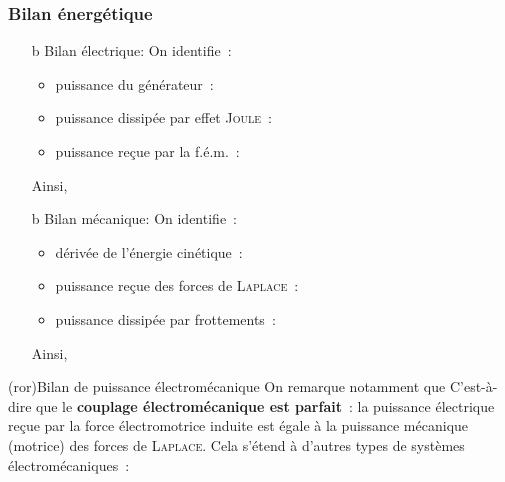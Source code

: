 \documentclass[../../main/main.tex]{subfiles}
\begin{document}
\subsubsection{Bilan énergétique}
\label{sssec:rlplmot_bilanrj}
\begin{itemize}
	\item[b]{Bilan électrique}:  On identifie~:
	\begin{itemize}
		\item puissance du générateur~: %
		\item puissance dissipée par effet \textsc{Joule}~: %
		\item puissance reçue par la f.é.m.~: %
	\end{itemize}
	Ainsi,
	\psw{%
		\[
			\boxed{\Pc\ind{gene}\sup{f} = \Pc_J\sup{r} + \Pc\ind{fem}\sup{r}}
		\]
	}%
	\item[b]{Bilan mécanique}: %
	On identifie~:
	\begin{itemize}
		\item dérivée de l'énergie cinétique~: %
		\item puissance reçue des forces de \textsc{Laplace}~: %
		\item puissance dissipée par frottements~: %
	\end{itemize}
	Ainsi,
	\psw{%
		\[
			\boxed{\dv{\Ec_c}{t} + \Pc_f\sup{f} = \Pc\ind{Lap}\sup{r}}
		\]
	}%
\end{itemize}

\begin{tcb*}[sidebyside](ror){Bilan de puissance électromécanique}
	On remarque notamment que
	\psw{%
		\[
			\boxed{\Pc\ind{fem}\sup{reçue} = \Pc\ind{Lap}\sup{reçue}}
		\]
	}%
	C'est-à-dire que le \textbf{couplage électromécanique est parfait}~: la
	puissance électrique reçue par la force électromotrice induite est égale à la
	puissance mécanique (motrice) des forces de \textsc{Laplace}.
	\tcblower
	Cela s'étend à d'autres types de systèmes électromécaniques~:
\end{tcb*}
\end{document}
